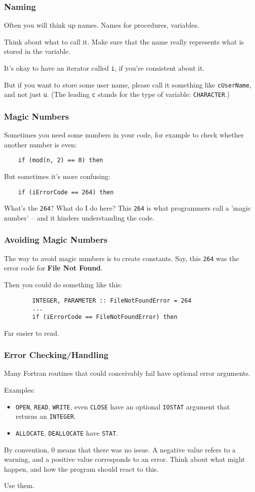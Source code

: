 \begin{frame}
    \frametitle{Naming}
    Often you will think up names. 
    Names for procedures, variables.

    Think about what to call it. 
    Make sure that the name really represents what is stored in the variable.

    It's okay to have an iterator called \texttt{i}, if you're consistent about it.
    
    But if you want to store some user name, please call it something like \texttt{cUserName}, and not just \texttt{u}.
    (The leading \texttt{c} stands for the type of variable: \texttt{CHARACTER}.)
\end{frame}

\begin{frame}[fragile]
    \frametitle{Magic Numbers}
    Sometimes you need some numbers in your code, for example to check whether another number is even:
    \begin{lstlisting}
    if (mod(n, 2) == 0) then
    \end{lstlisting}

    But sometimes it's more confusing:
    \begin{lstlisting}
    if (iErrorCode == 264) then
    \end{lstlisting}
    What's the \texttt{264}? What do I do here? This \texttt{264} is what programmers call a 'magic number' --
    and it hinders understanding the code.
\end{frame}

\begin{frame}[fragile]
    \frametitle{Avoiding Magic Numbers}
    The way to avoid magic numbers is to create constants.
    Say, this \texttt{264} was the error code for \textbf{File Not Found}.

    Then you could do something like this:
    \begin{lstlisting}
        INTEGER, PARAMETER :: FileNotFoundError = 264
        ...
        if (iErrorCode == FileNotFoundError) then
    \end{lstlisting}
    Far easier to read.
\end{frame}

\begin{frame}
    \frametitle{Error Checking/Handling}
    Many Fortran routines that could conceivably fail have 
    optional error arguments.

    Examples:

    \begin{itemize}
        \item \texttt{OPEN}, \texttt{READ}, \texttt{WRITE}, even \texttt{CLOSE} have an optional \texttt{IOSTAT} argument that returns an \texttt{INTEGER}.
        \item \texttt{ALLOCATE}, \texttt{DEALLOCATE} have \texttt{STAT}.
    \end{itemize}

    By convention, 0 means that there was no issue. A negative value refers to a warning, and a positive value corresponds to an error.
    Think about what might happen, and how the program should react to this.

    Use them.
\end{frame}

